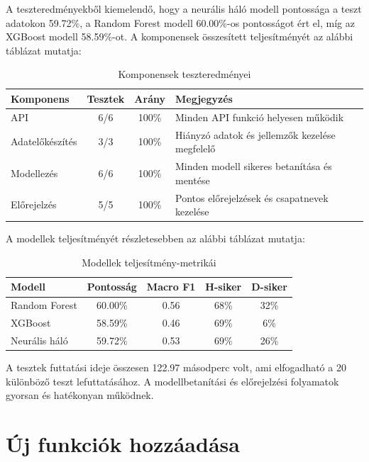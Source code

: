 A teszteredményekből kiemelendő, hogy a neurális háló modell pontossága a teszt adatokon 59.72\%, a Random Forest modell 60.00\%-os pontosságot ért el, míg az XGBoost modell 58.59\%-ot. A komponensek összesített teljesítményét az alábbi táblázat mutatja:

\begin{table}[h]
\centering
\begin{tabular}{|l|c|c|p{4cm}|}
\hline
\textbf{Komponens} & \textbf{Tesztek} & \textbf{Arány} & \textbf{Megjegyzés} \\
\hline
API & 6/6 & 100\% & Minden API funkció helyesen működik \\
\hline
Adatelőkészítés & 3/3 & 100\% & Hiányzó adatok és jellemzők kezelése megfelelő \\
\hline
Modellezés & 6/6 & 100\% & Minden modell sikeres betanítása és mentése \\
\hline
Előrejelzés & 5/5 & 100\% & Pontos előrejelzések és csapatnevek kezelése \\
\hline
\end{tabular}
\caption{Komponensek teszteredményei}
\label{tab:component-results}
\end{table}

A modellek teljesítményét részletesebben az alábbi táblázat mutatja:

\begin{table}[h]
\centering
\begin{tabular}{|l|c|c|c|c|}
\hline
\textbf{Modell} & \textbf{Pontosság} & \textbf{Macro F1} & \textbf{H-siker} & \textbf{D-siker} \\
\hline
Random Forest & 60.00\% & 0.56 & 68\% & 32\% \\
\hline
XGBoost & 58.59\% & 0.46 & 69\% & 6\% \\
\hline
Neurális háló & 59.72\% & 0.53 & 69\% & 26\% \\
\hline
\end{tabular}
\caption{Modellek teljesítmény-metrikái}
\label{tab:model-metrics}
\end{table}

A tesztek futtatási ideje összesen 122.97 másodperc volt, ami elfogadható a 20 különböző teszt lefuttatásához. A modellbetanítási és előrejelzési folyamatok gyorsan és hatékonyan működnek.

\section{Új funkciók hozzáadása}

